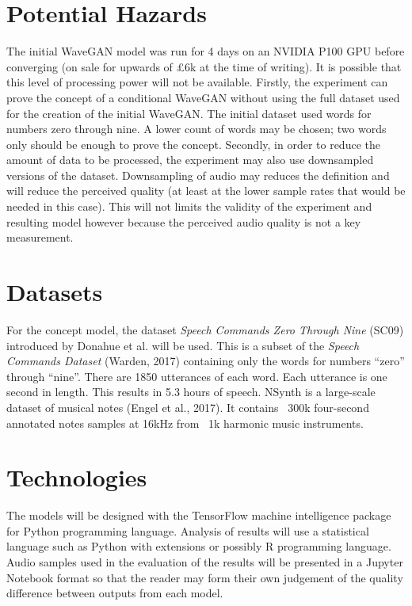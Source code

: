 \documentclass{article}
\begin{document}
\section{Potential Hazards}

The initial WaveGAN model was run for 4 days on an NVIDIA P100 GPU before converging (on sale for upwards of £6k at the time of writing).
It is possible that this level of processing power will not be available.
\newline
\newline
Firstly, the experiment can prove the concept of a conditional WaveGAN without using the full dataset used for the creation of the initial WaveGAN.
The initial dataset used words for numbers zero through nine.
A lower count of words may be chosen; two words only should be enough to prove the concept.
\newline
\newline
Secondly, in order to reduce the amount of data to be processed, the experiment may also use downsampled versions of the dataset.
Downsampling of audio may reduces the definition and will reduce the perceived quality (at least at the lower sample rates that would be needed in this case).
This will not limits the validity of the experiment and resulting model however because the perceived audio quality is not a key measurement.

\section{Datasets}

For the concept model, the dataset \textit{Speech Commands Zero Through Nine} (SC09) introduced by Donahue et al. will be used.
This is a subset of the \textit{Speech Commands Dataset} (Warden, 2017) containing only the words for numbers ``zero'' through ``nine''.
There are 1850 utterances of each word.
Each utterance is one second in length.
This results in 5.3 hours of speech.
\newline
\newline
NSynth is a large-scale dataset of musical notes (Engel et al., 2017).
It contains ~300k four-second annotated notes samples at 16kHz from ~1k harmonic music instruments.

\section{Technologies}

The models will be designed with the TensorFlow machine intelligence package for Python programming language.
Analysis of results will use a statistical language such as Python with extensions or possibly R programming language.
Audio samples used in the evaluation of the results will be presented in a Jupyter Notebook format so that the reader may form their own judgement of the quality difference between outputs from each model.
\end{document}
